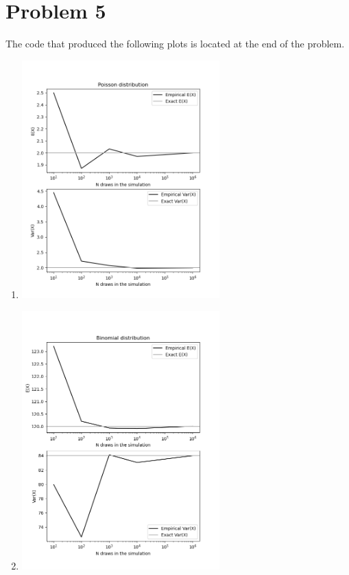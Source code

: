 \documentclass{article}
\newcommand{\1}{\mathbf{1}}
\begin{document}
\section*{Problem 5}
The code that produced the following plots is located at the end of the problem.
\begin{enumerate}
    \item 
    \begin{center}
    \includegraphics[width=3in]{STATS509/HW2/HW2Figures/problem5a.png}
    \end{center}
     \item 
    \begin{center}
    \includegraphics[width=3in]{STATS509/HW2/HW2Figures/problem5b.png}
    \end{center}
\end{enumerate}
\newpage

\end{document}
